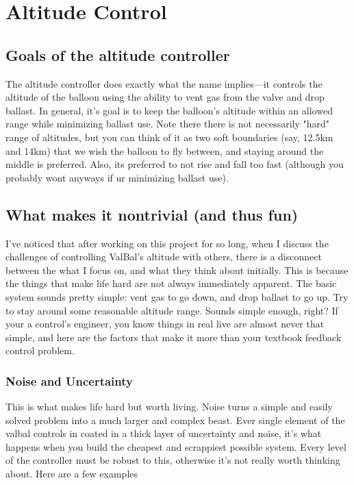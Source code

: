 \documentclass[11pt]{article}
\begin{document}
\tableofcontents

\section{Altitude Control}

\subsection{Goals of the altitude controller}

The altitude controller does exactly what the name implies---it controls the altitude of the balloon using the ability to vent gas from the valve and drop ballast. In general, it's goal is to keep the balloon's altitude within an allowed range while minimizing ballast use. Note there there is not necessarily "hard" range of altitudes, but you can think of it as two soft boundaries (say, 12.5km and 14km) that we wish the balloon to fly between, and staying around the middle is preferred. Also, its preferred to not rise and fall too fast (although you probably wont anyways if ur minimizing ballast use). 

\subsection{What makes it nontrivial (and thus fun)}

I've noticed that after working on this project for so long, when I discuss the challenges of controlling ValBal's altitude with others, there is a disconnect between the what I focus on, and what they think about initially. This is because the things that make life hard are not always immediately apparent. The basic system sounds pretty simple: vent gas to go down, and drop ballast to go up. Try to stay around some reasonable altitude range. Sounds simple enough, right? If your a control's engineer, you know things in real live are almost never that simple, and here are the factors that make it more than your textbook feedback control problem.
\subsubsection*{Noise and Uncertainty} 
This is what makes life hard but worth living. Noise turns a simple and easily solved problem into a much larger and complex beast. Ever single element of the valbal controls in coated in a thick layer of uncertainty and noise, it's what happens when you build the cheapest and scrappiest possible system. Every level of the controller must be robust to this, otherwise it's not really worth thinking about. Here are a few examples 
\end{document}
